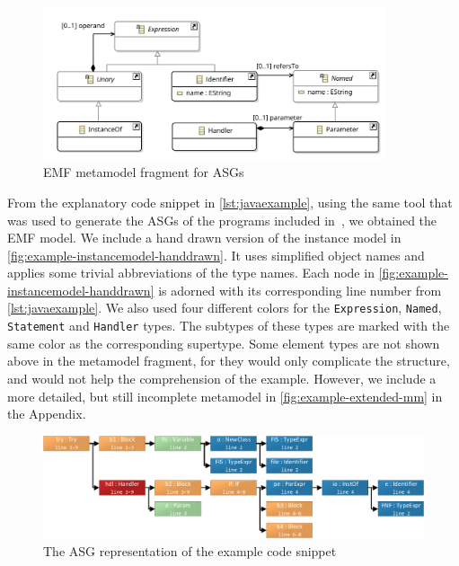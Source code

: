 \begin{figure}[!htp]
	\centering
	\includegraphics[width=0.9\textwidth]{figures/pdfs/example-metamodel.pdf}
	\caption{EMF metamodel fragment for ASGs}
	\label{fig:example-mm}
\end{figure}

From the explanatory code snippet in \autoref{lst:javaexample}, using the same tool that was used to generate the ASGs of the programs included in~\cite{DBLP:journals/infsof/UjhelyiSHCVVF15}, we obtained the EMF model.
We include a hand drawn version of the instance model in \autoref{fig:example-instancemodel-handdrawn}. It uses simplified object names and applies some trivial abbreviations of the type names. 
Each node in \autoref{fig:example-instancemodel-handdrawn} is adorned with its corresponding line number from  \autoref{lst:javaexample}.
We also used four different colors for the \texttt{Expression}, \texttt{Named}, \texttt{Statement} and \texttt{Handler} types. The subtypes of these types are marked with the same color as the corresponding supertype. Some element types are not shown above in the metamodel fragment, for they would only complicate the structure, and would not help the comprehension of the example. However, we include a more detailed, but still incomplete metamodel in \autoref{fig:example-extended-mm} in the Appendix.



\begin{figure}[!htp]
	\centering
	\includegraphics[width=\textwidth]{figures/pdfs/instance_model.pdf}
	\caption{The ASG representation of the example code snippet}
	\label{fig:example-instancemodel-handdrawn}
\end{figure}


